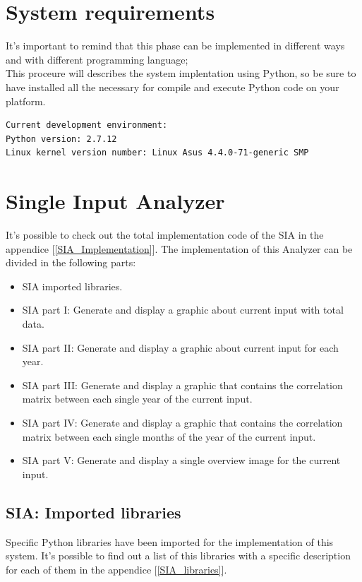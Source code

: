 \section{System requirements}
It's important to remind that this phase can be implemented in different ways and with different programming language;\\
This proceure will describes the system implentation using Python, so be sure to have installed all the necessary for compile and execute Python code on your platform.\\
\begin{lstlisting}
Current development environment:
Python version: 2.7.12
Linux kernel version number: Linux Asus 4.4.0-71-generic SMP
\end{lstlisting}

\newpage

\section{Single Input Analyzer}
It's possible to check out the total implementation code of the SIA in the appendice  [\ref{SIA_Implementation}].
The implementation of this Analyzer can be divided in the following parts:
\begin{itemize}
\item SIA imported libraries. 
\item SIA part I: Generate and display a graphic about current input with total data.
\item SIA part II: Generate and display a graphic about current input for each year.
\item SIA part III: Generate and display a graphic that contains the correlation matrix between each single year of the current input.
\item SIA part IV: Generate and display a graphic that contains the correlation matrix between each single months of the year of the current input.
\item SIA part V: Generate and display a single overview image for the current input.
\end{itemize}

\subsection{SIA: Imported libraries}
Specific Python libraries have been imported for the implementation of this system.
It's possible to find out a list of this libraries with a specific description for each of them in the appendice [\ref{SIA_libraries}].

